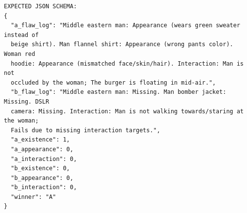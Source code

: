 \begin{verbatim}
EXPECTED JSON SCHEMA:
{
  "a_flaw_log": "Middle eastern man: Appearance (wears green sweater instead of
  beige shirt). Man flannel shirt: Appearance (wrong pants color). Woman red
  hoodie: Appearance (mismatched face/skin/hair). Interaction: Man is not
  occluded by the woman; The burger is floating in mid-air.",
  "b_flaw_log": "Middle eastern man: Missing. Man bomber jacket: Missing. DSLR
  camera: Missing. Interaction: Man is not walking towards/staring at the woman;
  Fails due to missing interaction targets.",
  "a_existence": 1,
  "a_appearance": 0,
  "a_interaction": 0,
  "b_existence": 0,
  "b_appearance": 0,
  "b_interaction": 0,
  "winner": "A"
}
\end{verbatim}
